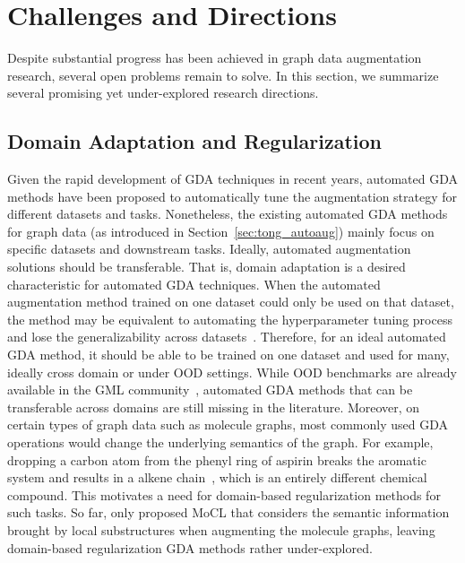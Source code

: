 \documentclass[11pt]{article}
\begin{document}
\section{Challenges and Directions}
\label{sec:tong_future}
Despite substantial progress has been achieved in graph data augmentation research, several open problems remain to solve. In this section, we summarize several promising yet under-explored research directions.

\subsection{Domain Adaptation and Regularization}
Given the rapid development of GDA techniques in recent years, automated GDA methods have been proposed to automatically tune the augmentation strategy for different datasets and tasks. 
Nonetheless, the existing automated GDA methods for graph data (as introduced in Section~\ref{sec:tong_autoaug}) mainly focus on specific datasets and downstream tasks. 
Ideally, automated augmentation solutions should be transferable. That is, domain adaptation is a desired characteristic for automated GDA techniques. When the automated augmentation method trained on one dataset could only be used on that dataset, the method may be equivalent to automating the hyperparameter tuning process and lose the generalizability across datasets~\cite{zhao2022autogda}. Therefore, for an ideal automated GDA method, it should be able to be trained on one dataset and used for many, ideally cross domain or under OOD settings. While OOD benchmarks are already available in the GML community~\cite{gui2022good}, automated GDA methods that can be transferable across domains are still missing in the literature. 
Moreover, on certain types of graph data such as molecule graphs, most commonly used GDA operations would change the underlying semantics of the graph. For example, dropping a carbon atom from the phenyl ring of aspirin breaks the aromatic system and results in a alkene chain~\cite{lee2021augmentation}, which is an entirely different chemical compound. This motivates a need for domain-based regularization methods for such tasks. So far, only \citet{sun2021mocl} proposed MoCL that considers the semantic information brought by local substructures when augmenting the molecule graphs, leaving domain-based regularization GDA methods rather under-explored.

\end{document}
